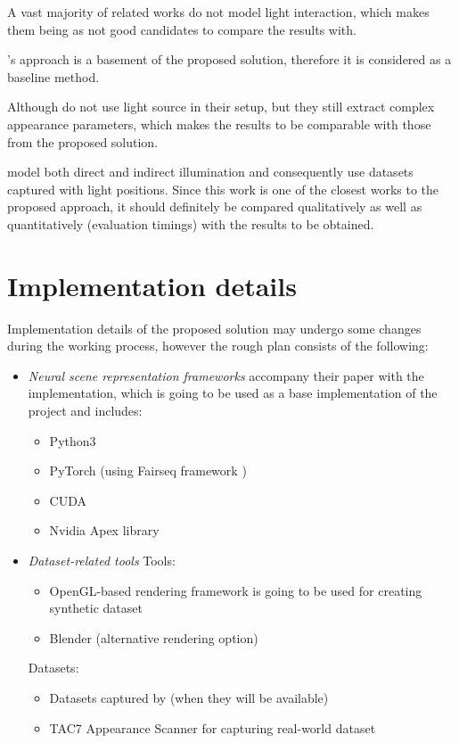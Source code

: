 \documentclass[english]{article}
\begin{document}
A vast majority of related works do not model light interaction, which makes them being as not good candidates to compare the results with.

\cite{nrf2020}'s approach is a basement of the proposed solution, therefore it is considered as a baseline method.

Although \cite{boss2020nerd} do not use light source in their setup, but they still extract complex appearance parameters, which makes the results to be comparable with those from the proposed solution.

\cite{srinivasan2020nerv} model both direct and indirect illumination and consequently use datasets captured with light positions. Since this work is one of the closest works to the proposed approach, it should definitely be compared qualitatively as well as quantitatively (evaluation timings) with the results to be obtained.

\section{Implementation details}

Implementation details of the proposed solution may undergo some changes during the working process, however the rough plan consists of the following:
\begin{itemize}
    \item \textit{Neural scene representation frameworks}
    \cite{nsvf2020} accompany their paper with the implementation, which is going to be used as a base implementation of the project and includes:
    \begin{itemize}
        \item Python3
        \item PyTorch (using Fairseq framework \cite{ott2019fairseq})
        \item CUDA
        \item Nvidia Apex library
    \end{itemize}
    
    \item \textit{Dataset-related tools}
    Tools:
    \begin{itemize}
        \item OpenGL-based rendering framework \cite{thies2019deferred} is going to be used for creating synthetic dataset
        \item Blender (alternative rendering option)
    \end{itemize}
    Datasets:
    \begin{itemize}
        \item Datasets captured by \cite{nrf2020} (when they will be available)
        \item TAC7 Appearance Scanner \cite{tac7} for capturing real-world dataset
    \end{itemize}
\end{itemize}
\end{document}
